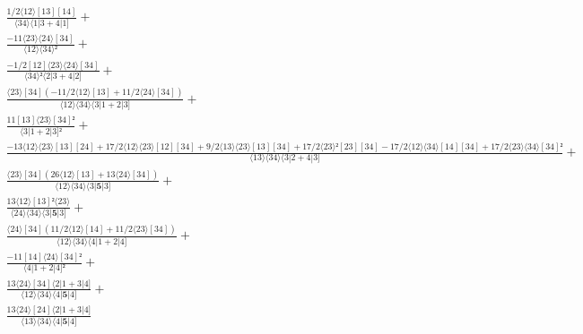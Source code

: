 \documentclass[varwidth, border=5pt]{standalone}
\begin{document}
\begin{my}
$\begin{gathered}
\scriptscriptstyle\frac{1/2⟨12⟩[13][14]}{⟨34⟩⟨1|3+4|1]} +\\
\scriptscriptstyle\frac{-11⟨23⟩⟨24⟩[34]}{⟨12⟩⟨34⟩²} +\\
\scriptscriptstyle\frac{-1/2[12]⟨23⟩⟨24⟩[34]}{⟨34⟩²⟨2|3+4|2]} +\\
\scriptscriptstyle\frac{⟨23⟩[34](-11/2⟨12⟩[13]+11/2⟨24⟩[34])}{⟨12⟩⟨34⟩⟨3|1+2|3]} +\\
\scriptscriptstyle\frac{11[13]⟨23⟩[34]²}{⟨3|1+2|3]²} +\\
\scriptscriptstyle\frac{-13⟨12⟩⟨23⟩[13][24]+17/2⟨12⟩⟨23⟩[12][34]+9/2⟨13⟩⟨23⟩[13][34]+17/2⟨23⟩²[23][34]-17/2⟨12⟩⟨34⟩[14][34]+17/2⟨23⟩⟨34⟩[34]²}{⟨13⟩⟨34⟩⟨3|2+4|3]} +\\
\scriptscriptstyle\frac{⟨23⟩[34](26⟨12⟩[13]+13⟨24⟩[34])}{⟨12⟩⟨34⟩⟨3|𝟓|3]} +\\
\scriptscriptstyle\frac{13⟨12⟩[13]²⟨23⟩}{⟨24⟩⟨34⟩⟨3|𝟓|3]} +\\
\scriptscriptstyle\frac{⟨24⟩[34](11/2⟨12⟩[14]+11/2⟨23⟩[34])}{⟨12⟩⟨34⟩⟨4|1+2|4]} +\\
\scriptscriptstyle\frac{-11[14]⟨24⟩[34]²}{⟨4|1+2|4]²} +\\
\scriptscriptstyle\frac{13⟨24⟩[34]⟨2|1+3|4]}{⟨12⟩⟨34⟩⟨4|𝟓|4]} +\\
\scriptscriptstyle\frac{13⟨24⟩[24]⟨2|1+3|4]}{⟨13⟩⟨34⟩⟨4|𝟓|4]} \phantom{+}
\end{gathered}$
\end{my}
\end{document}
